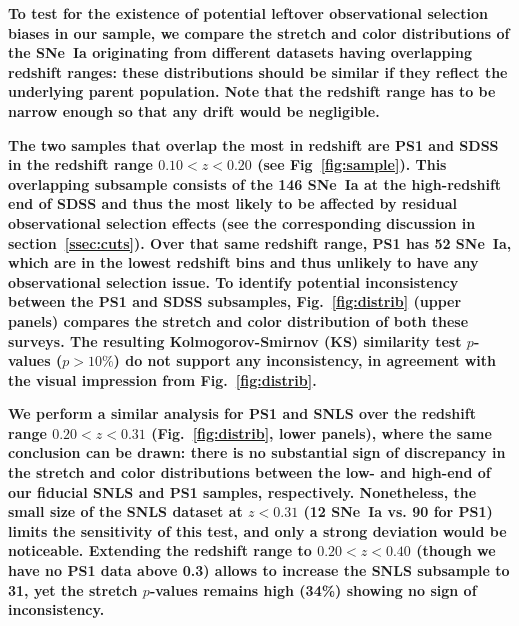 \documentclass[referee]{aa}
\begin{document}
\textbf{To test for the existence of potential leftover observational selection
    biases in our sample, we compare the stretch and color distributions of the
    SNe~Ia originating from different datasets having overlapping redshift
    ranges: these distributions should be similar if they reflect the underlying
    parent population. Note that the redshift range has to be narrow enough so
that any drift would be negligible.}

\textbf{The two samples that overlap the most in redshift are PS1 and SDSS in
    the redshift range $0.10 < z < 0.20$ (see Fig~\ref{fig:sample}). This
    overlapping subsample consists of the 146 SNe~Ia at the high-redshift end of
    SDSS and thus the most likely to be affected by residual observational
    selection effects (see the corresponding discussion in
    section~\ref{ssec:cuts}). Over that same redshift range, PS1 has 52 SNe~Ia,
    which are in the lowest redshift bins and thus unlikely to have any
    observational selection issue. To identify potential inconsistency between
    the PS1 and SDSS subsamples, Fig.~\ref{fig:distrib} (upper panels) compares
    the stretch and color distribution of both these surveys. The resulting
Kolmogorov-Smirnov (KS) similarity test $p$-values ($p >10\%$) do not support
any inconsistency, in agreement with the visual impression from
Fig.~\ref{fig:distrib}.}

\textbf{We perform a similar analysis for PS1 and SNLS over the redshift range
    $0.20 < z < 0.31$ (Fig.~\ref{fig:distrib}, lower panels), where the same
    conclusion can be drawn: there is no substantial sign of discrepancy in the
    stretch and color distributions between the low- and high-end of our
    fiducial SNLS and PS1 samples, respectively. Nonetheless, the small size of
    the SNLS dataset at $z < 0.31$ (12 SNe~Ia vs. 90 for PS1) limits the
    sensitivity of this test, and only a strong deviation would be noticeable.
Extending the redshift range to $0.20 < z < 0.40$ (though we have no PS1 data
above 0.3) allows to increase the SNLS subsample to 31, yet the stretch
$p$-values remains high (34\%) showing no sign of inconsistency.}
\end{document}
